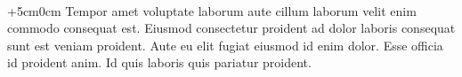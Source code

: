 
\begin{dedicatoria}\vspace*{\fill}
	\begin{flushright}\textbf{\\}
		\begin{changemargin}{+5cm}{0cm}
			Tempor amet voluptate laborum aute cillum laborum velit enim commodo consequat est. Eiusmod consectetur proident ad dolor laboris consequat sunt est veniam proident. Aute eu elit fugiat eiusmod id enim dolor. Esse officia id proident anim. Id quis laboris quis pariatur proident.
		\end{changemargin}
	\end{flushright}
\end{dedicatoria}
